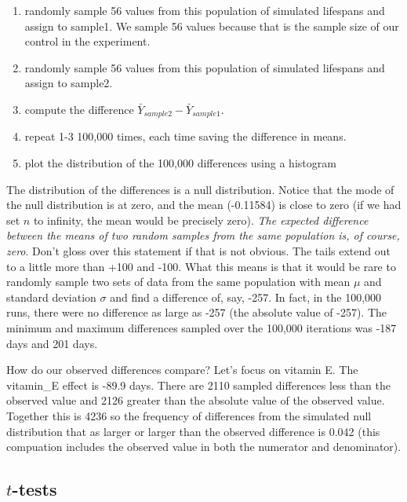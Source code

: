 \documentclass[]{book}
\providecommand{\tightlist}{%
  \setlength{\itemsep}{0pt}\setlength{\parskip}{0pt}}
\begin{document}
\begin{enumerate}
\def\labelenumi{\arabic{enumi}.}
\tightlist
\item
  randomly sample 56 values from this population of simulated lifespans
  and assign to sample1. We sample 56 values because that is the sample
  size of our control in the experiment.
\item
  randomly sample 56 values from this population of simulated lifespans
  and assign to sample2.
\item
  compute the difference \(\bar{Y}_{sample2} - \bar{Y}_{sample1}\).
\item
  repeat 1-3 100,000 times, each time saving the difference in means.
\item
  plot the distribution of the 100,000 differences using a histogram
\end{enumerate}

The distribution of the differences is a null distribution. Notice that
the mode of the null distribution is at zero, and the mean (-0.11584) is
close to zero (if we had set \(n\) to infinity, the mean would be
precisely zero). \emph{The expected difference between the means of two
random samples from the same population is, of course, zero}. Don't
gloss over this statement if that is not obvious. The tails extend out
to a little more than +100 and -100. What this means is that it would be
rare to randomly sample two sets of data from the same population with
mean \(\mu\) and standard deviation \(\sigma\) and find a difference of,
say, -257. In fact, in the 100,000 runs, there were no difference as
large as \textbar{}-257\textbar{} (the absolute value of -257). The
minimum and maximum differences sampled over the 100,000 iterations was
-187 days and 201 days.

How do our observed differences compare? Let's focus on vitamin E. The
vitamin\_E effect is -89.9 days. There are 2110 sampled differences less
than the observed value and 2126 greater than the absolute value of the
observed value. Together this is 4236 so the frequency of differences
from the simulated null distribution that as larger or larger than the
observed difference is 0.042 (this compuation includes the observed
value in both the numerator and denominator).

\subsection{\texorpdfstring{\(t\)-tests}{t-tests}}\label{t-tests}
\end{document}
